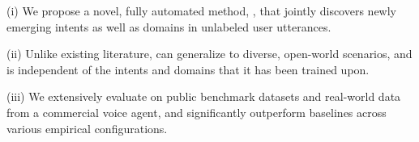(i) We propose a novel, fully automated method, \mname{}, that jointly discovers newly emerging intents as well as domains in unlabeled user utterances.%

(ii) Unlike existing literature, \mname{} can generalize to diverse, open-world scenarios, and is independent of the intents and domains that it has been trained upon.

(iii) We extensively evaluate \mname{} on public benchmark datasets and real-world data from a commercial voice agent, and significantly outperform baselines across various empirical configurations. 



